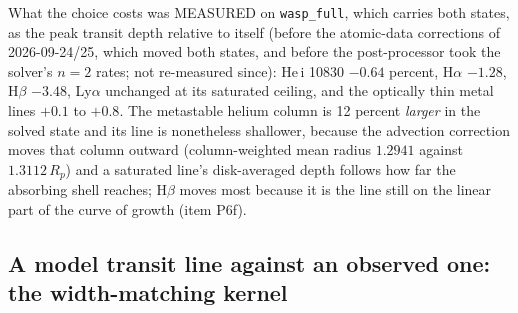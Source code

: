 What the choice costs was MEASURED on \texttt{wasp\_full}, which carries
both states, as the peak transit depth relative to itself (before the
atomic-data corrections of 2026-09-24/25, which moved both states, and
before the post-processor took the solver's $n=2$ rates; not re-measured
since): He\,{\sc i} 10830
$-0.64$ percent, H$\alpha$ $-1.28$, H$\beta$ $-3.48$, Ly$\alpha$ unchanged
at its saturated ceiling, and the optically thin metal lines $+0.1$ to $+0.8$.
The metastable helium column is 12 percent \emph{larger} in the solved
state and its line is nonetheless shallower, because the advection correction
moves that column outward (column-weighted mean radius $1.2941$ against
$1.3112\,R_p$) and a saturated line's disk-averaged depth follows how far
the absorbing shell reaches; H$\beta$ moves most because it is the line still
on the linear part of the curve of growth (item P6f).

\subsection{A model transit line against an observed one: the width-matching kernel}
\label{sec:postprocessing:widthmatch}

